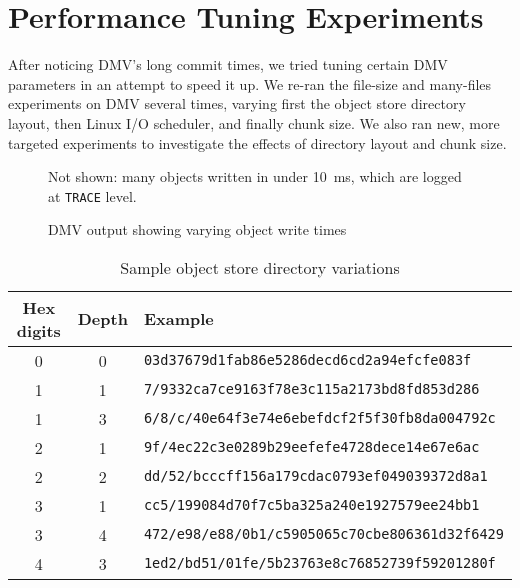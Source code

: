 \chapter{Performance Tuning Experiments}
\label{perf-tuning-exp-chapter}

After noticing \gls{DMV}'s long commit times, we tried tuning certain \gls{DMV}
parameters in an attempt to speed it up. We re-ran the file-size and many-files
experiments on \gls{DMV} several times, varying first the object store directory
layout, then Linux I/O scheduler, and finally chunk size. We also ran new, more
targeted experiments to investigate the effects of directory layout and chunk
size.

%



\begin{figure}[p]
    \caption{DMV output showing varying object write times}
    \label{write-times-log-output}
    \centering

    Not shown: many objects written in under \SI{10}{\ms}, which are logged at
    \lstinline{TRACE} level.

\end{figure}

\begin{table}[p]
    \caption{Sample object store directory variations}
    \label{sample-directory-scheme-variations}
    \centering
    \begin{tabular}{c c l}
        Hex digits & Depth & Example \\
        \midrule
        0 & 0 & \lstinline{03d37679d1fab86e5286decd6cd2a94efcfe083f} \\
        1 & 1 & \lstinline{7/9332ca7ce9163f78e3c115a2173bd8fd853d286} \\
        1 & 3 & \lstinline{6/8/c/40e64f3e74e6ebefdcf2f5f30fb8da004792c} \\
        2 & 1 & \lstinline{9f/4ec22c3e0289b29eefefe4728dece14e67e6ac} \\
        2 & 2 & \lstinline{dd/52/bcccff156a179cdac0793ef049039372d8a1} \\
        3 & 1 & \lstinline{cc5/199084d70f7c5ba325a240e1927579ee24bb1} \\
        3 & 4 & \lstinline{472/e98/e88/0b1/c5905065c70cbe806361d32f6429} \\
        4 & 3 & \lstinline{1ed2/bd51/01fe/5b23763e8c76852739f59201280f} \\
    \end{tabular}
\end{table}

